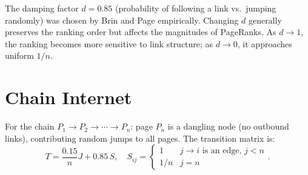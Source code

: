 The damping factor $d=0.85$ (probability of following a link vs.\ jumping randomly) was chosen by Brin and Page empirically. Changing $d$ generally preserves the ranking order but affects the magnitudes of PageRanks. As $d\to1$, the ranking becomes more sensitive to link structure; as $d\to0$, it approaches uniform $1/n$.

\section{Chain Internet}

For the chain $P_1\to P_2\to\cdots\to P_n$: page $P_n$ is a dangling node (no outbound links), contributing random jumps to all pages. The transition matrix is:
\[
T = \frac{0.15}{n}J + 0.85\,S, \quad S_{ij}=\begin{cases}1 & j\to i \text{ is an edge, }j<n\\1/n & j=n\end{cases}.
\]
